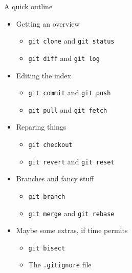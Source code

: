 \documentclass{beamer}
\begin{document}
\begin{frame}{A quick outline}

\begin{itemize}
\item Getting an overview
  \begin{itemize}
  \item \texttt{git clone} and \texttt{git status}
  \item \texttt{git diff} and \texttt{git log}
  \end{itemize}
\item Editing the index
  \begin{itemize}
  \item \texttt{git commit} and \texttt{git push}
  \item \texttt{git pull} and \texttt{git fetch}
  \end{itemize}
\item Reparing things
  \begin{itemize}
  \item \texttt{git checkout}
  \item \texttt{git revert} and \texttt{git reset}
  \end{itemize}
\item Branches and fancy stuff
  \begin{itemize}
  \item \texttt{git branch}
  \item \texttt{git merge} and \texttt{git rebase}
  \end{itemize}
\item Maybe some extras, if time permits
  \begin{itemize}
  \item \texttt{git bisect}
  \item The \texttt{.gitignore} file
  \end{itemize}
\end{itemize}

\end{frame}
\end{document}
